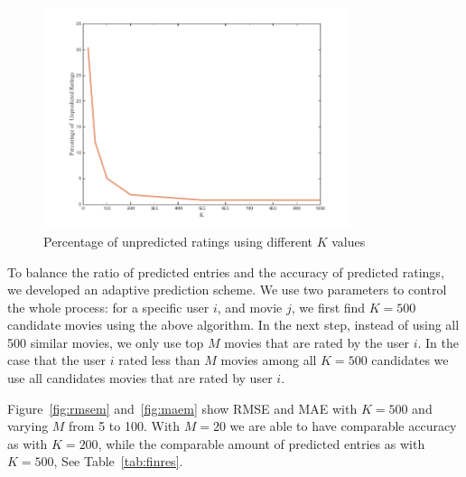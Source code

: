 \begin{figure}[!ht]
  \centering \includegraphics[width=0.8\textwidth]{images/perc.png}
  \caption{Percentage of unpredicted ratings using different $K$
    values}
  \label{fig:perc}
\end{figure}

To balance the ratio of predicted entries and the accuracy of
predicted ratings, we developed an adaptive prediction scheme. We use
two parameters to control the whole process: for a specific user $i$,
and movie $j$, we first find $K=500$ candidate movies using the above
algorithm. In the next step, instead of using all 500 similar movies,
we only use top $M$ movies that are rated by the user $i$. In the case
that the user $i$ rated less than $M$ movies among all $K=500$
candidates we use all candidates movies that are rated by user $i$.


Figure~\ref{fig:rmsem} and~\ref{fig:maem} show RMSE and MAE with
$K=500$ and varying $M$ from 5 to 100. With $M=20$ we are able to have
comparable accuracy as with $K=200$, while the comparable amount of
predicted entries as with $K=500$, See Table~\ref{tab:finres}.


